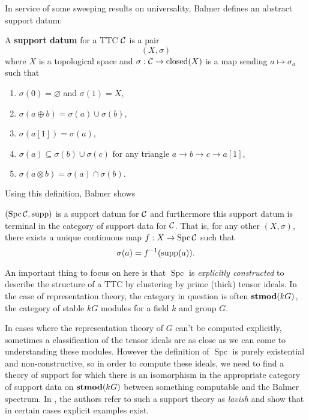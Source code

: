 \documentclass [11pt, proquest] {uwthesis}[2020/02/24]
\DeclareMathOperator{\Spc}{Spc}
\begin{document}
    In service of some sweeping results on universality, Balmer defines an abstract support datum:
    \begin{defn}
    	A \textbf{support datum} for a TTC $\mathcal{C}$ is a pair 
    	\[(X,\sigma)\]
    	where $X$ is a topological space and $\sigma:\mathcal{C}\to \operatorname{closed}(X)$ is a map sending $a\mapsto\sigma_a$ such that 
    	\begin{enumerate}
    		\item $\sigma(0)=\varnothing$ and $\sigma(1)=X$,
    		\item $\sigma(a\oplus b)=\sigma(a)\cup\sigma(b)$,
    		\item $\sigma (a[1])=\sigma(a)$,
    		\item $\sigma(a)\subseteq \sigma(b)\cup\sigma(c)$ for any triangle $a\to b\to c\to a[1]$,
    		\item $\sigma(a\otimes b)=\sigma(a)\cap\sigma(b).$
    	\end{enumerate}
    \end{defn}
    Using this definition, Balmer shows 
    \begin{thm}
    	$(\Spc\calC,\supp)$ is a support datum for $\mathcal{C}$ and furthermore this support datum is terminal in the category of 
    	support data for $\mathcal{C}$. That is, for any other $(X,\sigma)$, there exists a unique continuous map $f:X\to \Spc\calC$ such that 
    	\[\sigma(a)=f^{-1}(\operatorname{supp}(a)).\]
    \end{thm}
    
    \begin{rmk}
        An important thing to focus on here is that $\Spc$ is \textit{explicitly constructed} to describe the structure of a TTC by clustering by 
        prime (thick) tensor ideals. In the case of representation theory, the category in question is often $\operatorname{\mathbf{stmod}}(kG)$, the category of stable $kG$ modules for a field $k$ and group $G$.
        
        In cases where the representation theory of $G$ can't be computed explicitly, sometimes a classification of the tensor ideals are as close as we can come to understanding these modules. However the definition of $\Spc$ is purely existential and non-constructive, so in order to compute these ideals, we need to find a theory of support for which there is an isomorphism in the appropriate category of support data on $\operatorname{\mathbf{stmod}}(kG)$ between something computable and the Balmer spectrum. In \cite{negron-pevtsovaIII}, the authors refer to such a support theory as \textit{lavish} and show that in certain cases explicit examples exist.
    \end{rmk}
    
\end{document}
